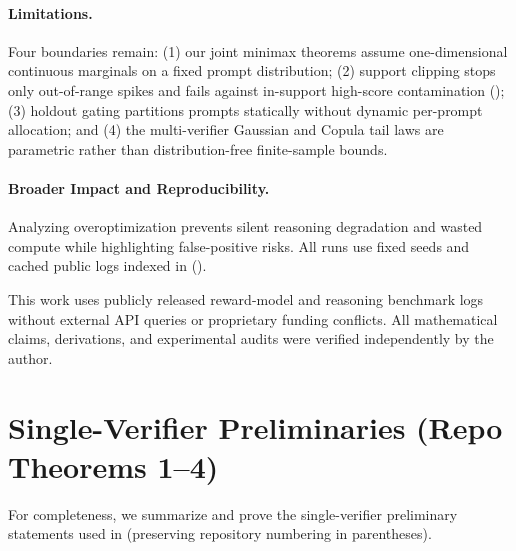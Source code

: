 \documentclass{article}
\theoremstyle{plain}
\theoremstyle{definition}
\theoremstyle{remark}
\begin{document}
\paragraph{Limitations.}
Four boundaries remain: (1) our joint minimax theorems assume one-dimensional continuous marginals on a fixed prompt distribution; (2) support clipping stops only out-of-range spikes and fails against in-support high-score contamination (); (3) holdout gating partitions prompts statically without dynamic per-prompt allocation; and (4) the multi-verifier Gaussian and Copula tail laws are parametric rather than distribution-free finite-sample bounds.

\paragraph{Broader Impact and Reproducibility.}
Analyzing overoptimization prevents silent reasoning degradation and wasted compute while highlighting false-positive risks. All runs use fixed seeds and cached public logs indexed in  ().

\begin{ack}
This work uses publicly released reward-model and reasoning benchmark logs without external API queries or proprietary funding conflicts. All mathematical claims, derivations, and experimental audits were verified independently by the author.
\end{ack}




\newpage
\appendix
{}

\section{Single-Verifier Preliminaries (Repo Theorems 1--4)}
\label{app:preliminaries}

For completeness, we summarize and prove the single-verifier preliminary statements used in  (preserving repository numbering in parentheses).
\end{document}
